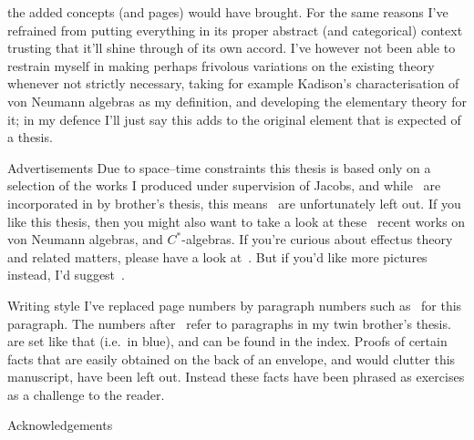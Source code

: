 \documentclass[b5paper]{book}
\begin{document}
\begin{parsec}
\begin{point}
the added concepts
(and pages) would have brought.
For the same reasons
I've refrained from putting
everything in its proper abstract (and categorical\cite{maclane}) context
trusting that it'll shine through of its own accord.
I've however not been able to restrain
myself in making perhaps frivolous variations on the existing
theory whenever not strictly necessary,
taking for example Kadison's characterisation\cite{kadison1956}
of von Neumann algebras
as my definition,
and developing the elementary theory for it;
in my defence I'll just say this adds to
the original element that is expected of a thesis.
\end{point}
\begin{point}{Advertisements}%
Due to space--time constraints
this thesis is based only on a selection
\cite{model,cho2015quotient,cho2016duplicable,qpakm,westerbaan2016universal}
of the works
I produced under supervision of Jacobs,
and while~\cite{wwpaschke,effintro,statesofconvexsets}
are incorporated in by brother's thesis,
this means~\cite{jacobs2015effect,jacobs2017distances} 
are unfortunately left out.
If you like this thesis,
then
you might also want to take a look
at these~\cite{rennela2017infinite,
rennela2015complete,
furber2013kleisli,
kornell2012,
heunen2015domains,
Maassen2010} recent works on von Neumann algebras,
and $C^*$-algebras.
If you're curious
about effectus theory
and related matters,
please have a look at~\cite{jacobs2017quantum,
cho2017disintegration,
jacobs2016hyper,
jacobs2017channel,
jacobs2017formal,
cho2017efprob,
jacobs2017probability,
jacobs2017recipe,
jacobs2016effectuses,
jacobs2016affine,
jacobs2016relating,
effintro,
statesofconvexsets,
cho2015quotient,
jacobs2017distances,
jacobs2015effect,
jacobs2016expectation,
jacobs2016predicate,
newdirections}.
But if you'd like more pictures instead,
I'd suggest~\cite{coecke2017picturing}.
\end{point}
\begin{point}{Writing style}
I've replaced page numbers by
paragraph numbers
such as~
for this paragraph.
The numbers after~ refer to paragraphs
	in my twin brother's thesis\cite{bas}.
 are set like that
(i.e.~in blue),
and can be found in the index.
Proofs of certain facts
that are easily obtained on the back of an envelope,
and would clutter this manuscript,
have been left out.
Instead these facts have been phrased as exercises
as a challenge to the reader.
\end{point}
\begin{point}{Acknowledgements}

\end{point}
\end{parsec}
\end{document}

